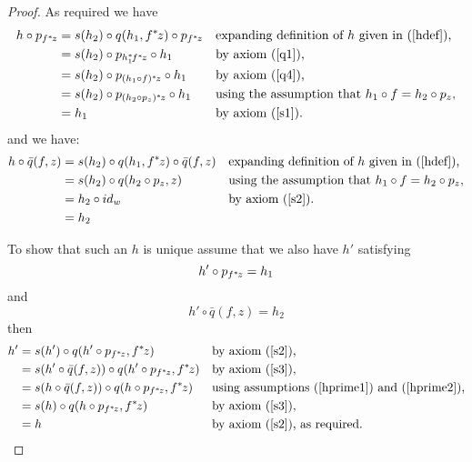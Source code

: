 \documentclass[10pt,a4paper]{scrartcl}
\renewcommand{\sub}{^*\kern-1pt}
\newcommand{\byaxiom}[1]{by axiom (\ref{#1})}
\newcommand{\qbar}{\bar{q}}
\renewcommand{\qq}[2]{\qbar(#1,#2)}   %
\begin{document}
\begin{proof}
\noindent
As required we have 
\begin{align*}
h \circ p_{f \sub z}
       & = s(h_2) \circ q(h_1,f \sub z) \circ p_{f \sub z}   && \mbox{expanding definition of $h$ given in (\ref{hdef}),}   \\ 
       & = s(h_2) \circ p_{h_1 \sub f \sub z} \circ h_1      && \mbox{\byaxiom{q1},}                                        \\
	   & = s(h_2) \circ p_{(h_1 \circ f) \sub z} \circ h_1   && \mbox{\byaxiom{q4},}                                        \\
	   & = s(h_2) \circ p_{(h_2 \circ p_z) \sub z} \circ h_1 && \mbox{using the assumption that }h_1 \circ f = h_2 \circ p_z,                   \\
       & = h_1                                               && \mbox{\byaxiom{s1}.}
\end{align*}
\noindent
and we have:
\begin{align*}
h \circ \qq{f}{z}
    & = s(h_2) \circ q(h_1,f \sub z) \circ \qq{f}{z} && \mbox{expanding definition of $h$ given in (\ref{hdef}),}      \\
	& = s(h_2) \circ q(h_2 \circ p_z ,z)          && \mbox{using the assumption that }h_1 \circ f = h_2 \circ p_z,                      \\
    & = h_2  \circ id_w                           && \mbox{\byaxiom{s2}.}                                           \\
	& = h_2
\end{align*}

\noindent 
To show that such an $h$ is unique assume that we also have $h'$ satisfying
\begin{equation}
\label{hprime1}
h' \circ p_{f \sub z} = h_1
\end{equation}
and
\begin{equation}
\label{hprime2}
h' \circ \qq{f}{z} = h_2
\end{equation}
\noindent then
\begin{align*}
h'
        & = s(h') \circ q(h' \circ p_{f \sub z},f \sub z)              &&\mbox{\byaxiom{s2},}                           \\
		& = s(h' \circ \qq{f}{z}) \circ q(h' \circ p_{f \sub z},f \sub z) &&\mbox{\byaxiom{s3}, }                          \\
        & = s(h  \circ \qq{f}{z}) \circ q(h \circ p_{f \sub z},f \sub z)  &&\mbox{using assumptions (\ref{hprime1}) and (\ref{hprime2}),} \\
		& = s(h)               \circ q(h \circ p_{f \sub z},f \sub z)  &&\mbox{\byaxiom{s3},}                           \\
		& = h                                                          &&\mbox{\byaxiom{s2}, as required.}
\end{align*}
\end{proof}
\end{document}

